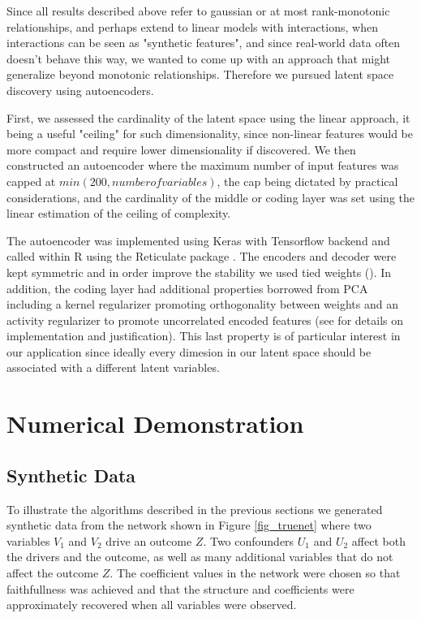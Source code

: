 \documentclass{article}
\begin{document}
Since all results described above refer to gaussian or at most rank-monotonic relationships, and perhaps extend to linear models with interactions, when interactions can be seen as "synthetic features", and since real-world data often doesn't behave this way, we wanted to come up with an approach that might generalize beyond monotonic relationships.  Therefore we pursued latent space discovery using autoencoders.

First, we assessed the cardinality of the latent space using the linear approach, it being a useful "ceiling" for such dimensionality, since non-linear features would be more compact and require lower dimensionality if discovered.  We then constructed an autoencoder where the maximum number of input features was capped at $min(200, number of variables)$, the cap being dictated by practical considerations, and the cardinality of the middle or coding layer was set using the linear estimation of the ceiling of complexity.

The autoencoder was implemented using Keras with Tensorflow backend and called within R using the Reticulate package \cite{rstudioreticulate_2020}. The encoders and decoder were kept symmetric and in order improve the stability we used tied weights (\cite{forumae}). In addition, the coding layer had additional properties borrowed from PCA including a kernel regularizer promoting orthogonality between weights and an activity regularizer to promote uncorrelated encoded features (see \cite{ranjan_build_2019} for details on implementation and justification). This last property is of particular interest in our application since ideally every dimesion in our latent space should be associated with a different latent variables.

\section{Numerical Demonstration}
\subsection{Synthetic Data}
To illustrate  the algorithms described in the previous sections we
generated synthetic data from the network shown in Figure
\ref{fig_truenet} where two variables $V_1$ and $V_2$ drive an outcome
$Z$. Two confounders $U_1$ and $U_2$ affect both the drivers and the
outcome, as well as many additional variables that do not affect the
outcome $Z$.
The coefficient values in the network were chosen
so that faithfullness was achieved and that the structure
and coefficients were approximately recovered when all variables were observed.
\end{document}
